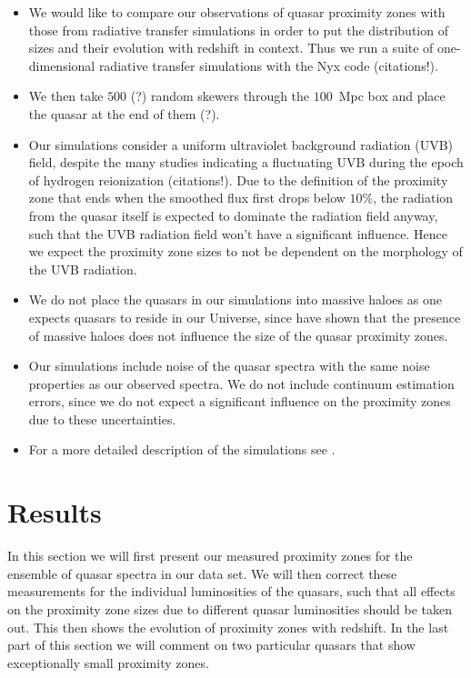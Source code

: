 \documentclass[iop]{emulateapj}
\begin{document}
\begin{itemize}
\item We would like to compare our observations of quasar proximity zones with those from radiative transfer simulations in order to put the distribution of sizes and their evolution with redshift in context. Thus we run a suite of one-dimensional radiative transfer simulations with the Nyx code (citations!). 
\item We then take $500$ (?) random skewers through the $100$~Mpc box and place the quasar at the end of them (?). 
\item Our simulations consider a uniform ultraviolet background radiation (UVB) field, despite the many studies indicating a fluctuating UVB during the epoch of hydrogen reionization (citations!). Due to the definition of the proximity zone that ends when the smoothed flux first drops below $10\%$, the radiation from the quasar itself is expected to dominate the radiation field anyway, such that the UVB radiation field won't have a significant influence. Hence we expect the proximity zone sizes to not be dependent on the morphology of the UVB radiation. 
\item We do not place the quasars in our simulations into massive haloes as one expects quasars to reside in our Universe, since \citet{Keating2015} have shown that the presence of massive haloes does not influence the size of the quasar proximity zones. 
\item Our simulations include noise of the quasar spectra with the same noise properties as our observed spectra. We do not include continuum estimation errors, since we do not expect a significant influence on the proximity zones due to these uncertainties. 
\item For a more detailed description of the simulations see \citet{DaviesFurlanetto2016}. 
\end{itemize}
 

\section{Results}\label{sec:results}

In this section we will first present our measured proximity zones for the ensemble of quasar spectra in our data set. We will then correct these measurements for the individual luminosities of the quasars, such that all effects on the proximity zone sizes due to different quasar luminosities should be taken out. This then shows the evolution of proximity zones with redshift. In the last part of this section we will comment on two particular quasars that show exceptionally small proximity zones. 
\end{document}
